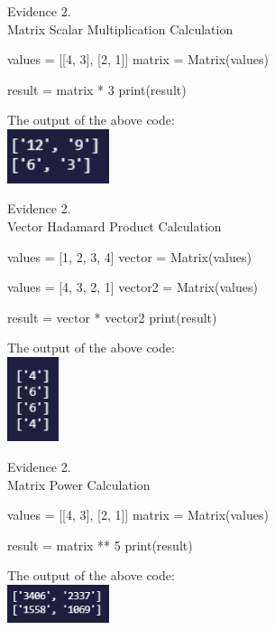 \begin{center}
    {\large Evidence 2.\rn } \\ 
    \vspace{0.3cm}
    Matrix Scalar Multiplication Calculation \\
    \begin{pythoncode}
values = [[4, 3],
        [2, 1]]
matrix = Matrix(values)

result = matrix * 3 
print(result)
    \end{pythoncode}
    The output of the above code: \\
    \includegraphics[width=3cm]{Images/Testing/T2.10.1.PNG} \\
    \vspace{1cm}

    {\large Evidence 2.\rn } \\ 
    \vspace{0.3cm}
    Vector Hadamard Product Calculation \\
    \begin{pythoncode}
values = [1, 2, 3, 4]
vector = Matrix(values)

values = [4, 3, 2, 1]
vector2 = Matrix(values)

result = vector * vector2
print(result)
    \end{pythoncode}
    The output of the above code: \\
    \includegraphics[width=1.5cm]{Images/Testing/T2.11.1.PNG} \\
    \vspace{1cm}

    {\large Evidence 2.\rn } \\ 
    \vspace{0.3cm}
    Matrix Power Calculation \\
    \begin{pythoncode}
values = [[4, 3],
        [2, 1]]
matrix = Matrix(values)

result = matrix ** 5
print(result)
    \end{pythoncode}
    The output of the above code: \\
    \includegraphics[width=3cm]{Images/Testing/T2.12.1.PNG} \\
    \vspace{1cm}


\end{center}
